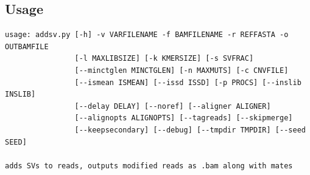 \documentclass[letterpaper,11pt]{article}
\begin{document}
\subsection{Usage}
\begin{verbatim}
usage: addsv.py [-h] -v VARFILENAME -f BAMFILENAME -r REFFASTA -o OUTBAMFILE
                [-l MAXLIBSIZE] [-k KMERSIZE] [-s SVFRAC]
                [--minctglen MINCTGLEN] [-n MAXMUTS] [-c CNVFILE]
                [--ismean ISMEAN] [--issd ISSD] [-p PROCS] [--inslib INSLIB]
                [--delay DELAY] [--noref] [--aligner ALIGNER]
                [--alignopts ALIGNOPTS] [--tagreads] [--skipmerge]
                [--keepsecondary] [--debug] [--tmpdir TMPDIR] [--seed SEED]

adds SVs to reads, outputs modified reads as .bam along with mates


\end{verbatim}
\end{document}
